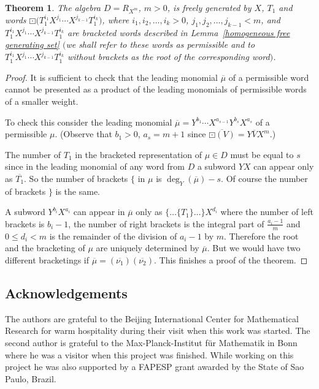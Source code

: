 \documentclass[10pt,a4paper]{amsart}
\numberwithin{equation}{section}
\newtheorem{Theorem}{Theorem}[section]
\begin{document}
\begin{Theorem}The algebra $D = R_{X^m}$, $m > 0$, is freely generated by $X$, $T_1$ and words $\boxdot\big(T_1^{i_1}X^{j_1} \cdots \allowbreak X^{j_{k-1}}T_1^{i_k}\big)$, where $i_1, i_2, \ldots,i_k > 0$, $j_1, j_2, \ldots, j_{k-1} < m$, and $T_1^{i_1}X^{j_1} \cdots X^{j_{k-1}}T_1^{i_k}$ are bracketed words described in Lemma~{\rm \ref{homogeneous free generating set}} $($we shall refer to these words as permissible and to $T_1^{i_1}X^{j_1} \cdots X^{j_{k-1}}T_1^{i_k}$ without brackets as the root of the corresponding word$)$.
\end{Theorem}

\begin{proof}It is sufficient to check that the leading monomial $\overline{\mu}$ of a permissible word cannot be presented as a product of the leading monomials of permissible words of a smaller weight.

To check this consider the leading monomial $\overline{\mu} = Y^{b_1} \cdots X^{a_{s-1}}Y^{b_s}X^{a_s}$ of a permissible $\mu$. (Observe that $b_1 > 0$, $a_s = m+1$ since $\overline{\boxdot(V)} =Y\overline{V}X^m$.)

The number of $T_1$ in the bracketed representation of $\mu \in D$ must be equal to $s$ since in the leading monomial of any word from $D$ a subword $YX$ can appear only as $\overline{T_1}$. So the number of brackets $\{$ in $\mu$ is $\deg_Y(\overline{\mu}) - s$. Of course the number of brackets $\}$ is the same.

A subword $Y^{b_i}X^{a_i}$ can appear in $\overline{\mu}$ only as $\{\ldots\{T_1\}\ldots\}X^{d_i}$ where the number of left brackets is $b_i - 1$, the number of right brackets is the integral part of $\frac{a_i - 1}{m}$ and $0 \leq d_i <m$ is the remainder of the division of $a_i - 1$ by $m$. Therefore the root and the bracketing of $\mu$ are uniquely determined by $\overline{\mu}$. But we would have two different bracketings if $\overline{\mu} = (\overline{\nu_1})(\overline{\nu_2})$. This finishes a proof of the theorem.
\end{proof}


\subsection*{Acknowledgements}

The authors are grateful to the Beijing International Center for Mathematical Research for warm hospitality during their visit when this work was started. The second author is grateful to the Max-Planck-Institut f\"ur Mathematik in Bonn where he was a visitor when this project was finished. While working on this project he was also supported by a FAPESP grant awarded by the State of Sao Paulo, Brazil.
\end{document}
